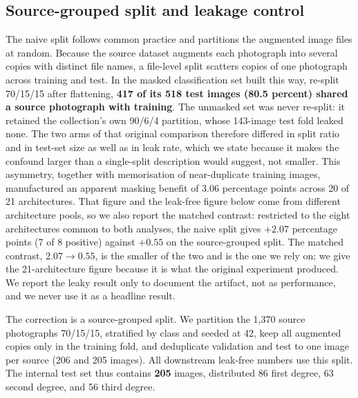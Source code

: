 \documentclass{melba}
\begin{document}
\subsection{Source-grouped split and leakage control}
\label{Mat:leak}
The naive split follows common practice and partitions the augmented image files at random. Because the source dataset augments each photograph into several copies with distinct file names, a file-level split scatters copies of one photograph across training and test. In the masked classification set built this way, re-split 70/15/15 after flattening, \textbf{417 of its 518 test images (80.5 percent) shared a source photograph with training}. The unmasked set was never re-split: it retained the collection's own 90/6/4 partition, whose 143-image test fold leaked none. The two arms of that original comparison therefore differed in split ratio and in test-set size as well as in leak rate, which we state because it makes the confound larger than a single-split description would suggest, not smaller. This asymmetry, together with memorisation of near-duplicate training images, manufactured an apparent masking benefit of 3.06 percentage points across 20 of 21 architectures. That figure and the leak-free figure below come from different architecture pools, so we also report the matched contrast: restricted to the eight architectures common to both analyses, the naive split gives $+2.07$ percentage points (7 of 8 positive) against $+0.55$ on the source-grouped split. The matched contrast, $2.07 \rightarrow 0.55$, is the smaller of the two and is the one we rely on; we give the 21-architecture figure because it is what the original experiment produced. We report the leaky result only to document the artifact, not as performance, and we never use it as a headline result.

The correction is a source-grouped split. We partition the 1{,}370 source photographs 70/15/15, stratified by class and seeded at 42, keep all augmented copies only in the training fold, and deduplicate validation and test to one image per source (206 and 205 images). All downstream leak-free numbers use this split. The internal test set thus contains \textbf{205} images, distributed 86 first degree, 63 second degree, and 56 third degree.
\end{document}
